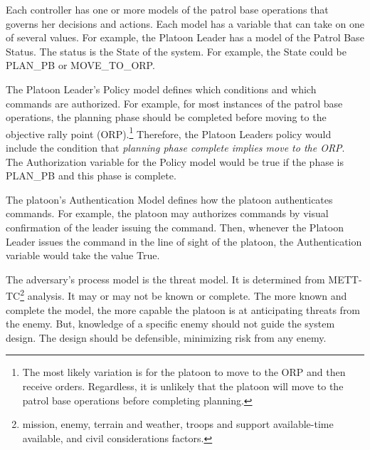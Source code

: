 \documentclass[../../main/main.tex]{subfiles}
\begin{document}
 Each controller has one or more models of the patrol base operations that governs her decisions and actions.  Each model has a variable that can take on one of several values.  For example, the Platoon Leader has a model of the Patrol Base Status.  The status is the State of the system.  For example, the State could be PLAN_PB or MOVE_TO_ORP.   
 
 The Platoon Leader's Policy model defines which conditions and which commands are authorized.  For example, for most instances of the patrol base operations, the planning phase should be completed before moving to the objective rally point (ORP).\footnote{The most likely variation is for the platoon to move to the ORP and then receive orders.   Regardless, it is unlikely that the platoon will move to the patrol base operations before completing planning.}  Therefore, the Platoon Leaders policy would include the condition that \textit{planning phase complete implies move to the ORP}.  The Authorization variable for the Policy model would be true if the phase is PLAN_PB and this phase is complete.  
 
 The platoon's Authentication Model defines how the platoon authenticates commands.    For example, the platoon may authorizes commands by visual confirmation of the leader issuing the command.  Then, whenever the Platoon Leader issues the command in the line of sight of the platoon, the Authentication variable would take the value True.   
 
 The adversary's process model is the threat model.  It is determined from METT-TC\footnote{mission, enemy, terrain and weather, troops and support available-time available, and civil considerations factors.} analysis.  It may or may not be known or complete.  The more known and complete the model, the more capable the platoon is at anticipating threats from the enemy.  But, knowledge of a specific enemy should not guide the system design.  The design should be defensible, minimizing risk from any enemy.
\clearpage
\end{document}
